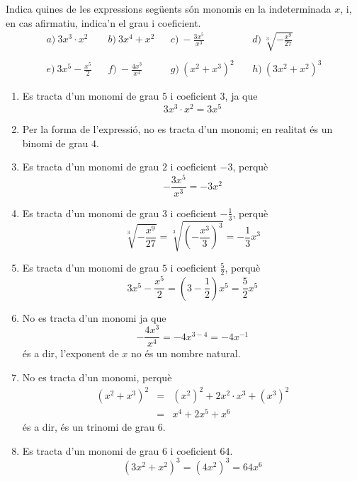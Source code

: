 \begin{exercici}
Indica quines de les expressions següents són monomis en la
indeterminada $x$, i, en cas afirmatiu, indica'n el grau i coeficient.\[
\begin{array}{lllllll}
a)~3x^{3}\cdot x^{2} & & b)~3x^{4}+x^{2} & & c)~-\frac{3x^{5}}{x^{3}} & &
d)~\sqrt[3]{-\frac{x^{9}}{27}} \\
& & & & & & \\
e)~3x^{5}-\frac{x^{5}}{2} & & f)~-\frac{4x^{3}}{x^{4}} & &
g)~(x^{2}+x^{3})^{2}~ & & h)~(3x^{2}+x^{2})^{3}\end{array}\]
\end{exercici}

\begin{solucio}

\begin{enumerate}
\item[a)] Es tracta d'un monomi de grau $5$ i coeficient $3$, ja que\[
3x^{3}\cdot x^{2}=3x^{5}
\]

\item[b)] Per la forma de l'expressió, no es tracta d'un monomi; en
realitat és un binomi de grau $4$.

\item[c)] Es tracta d'un monomi de grau $2$ i coeficient $-3$, perquè\[
-\frac{3x^{5}}{x^{3}}=-3x^{2}
\]

\item[d)] Es tracta d'un monomi de grau $3$ i coeficient $-\frac{1}{3}$,
perquè\[
\sqrt[3]{-\frac{x^{9}}{27}}=\sqrt[3]{\left( -\frac{x^{3}}{3}\right) ^{3}}=-\frac{1}{3}x^{3}
\]

\item[e)] Es tracta d'un monomi de grau $5$ i coeficient $\frac{5}{2}$,
perquè\[
3x^{5}-\frac{x^{5}}{2}=\left( 3-\frac{1}{2}\right) x^{5}=\frac{5}{2}x^{5}
\]

\item[f)] No es tracta d'un monomi ja que\[
-\frac{4x^{3}}{x^{4}}=-4x^{3-4}=-4x^{-1}
\]és a dir, l'exponent de $x$ no és un nombre natural.

\item[g)] No es tracta d'un monomi, perquè\begin{eqnarray*}
(x^{2}+x^{3})^{2} &=&(x^{2})^{2}+2x^{2}\cdot x^{3}+(x^{3})^{2} \\
&=&x^{4}+2x^{5}+x^{6}
\end{eqnarray*}és a dir, és un trinomi de grau $6$.

\item[h)] Es tracta d'un monomi de grau $6$ i coeficient $64$.\[
(3x^{2}+x^{2})^{3}=(4x^{2})^{3}=64x^{6}
\]
\end{enumerate}
\end{solucio}

